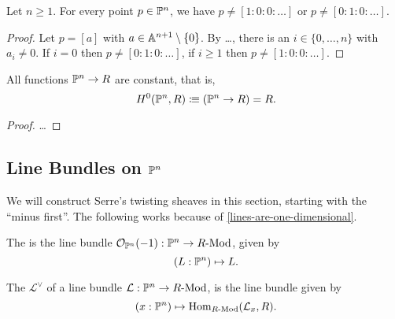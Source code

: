 \begin{lemma}
  Let $n \geq 1$.
  For every point $p \in \mathbb{P}^n$,
  we have $p \neq [1 : 0 : 0 : \dots]$
  or $p \neq [0 : 1 : 0 : \dots]$.
\end{lemma}

\begin{proof}
  Let $p = [a]$ with $a \in \mathbb{A}^{n+1} \setminus \{0\}$.
  By \dots,
  there is an $i \in \{0, \dots, n\}$ with $a_i \neq 0$.
  If $i = 0$ then $p \neq [0 : 1 : 0 : \dots]$,
  if $i \geq 1$ then $p \neq [1 : 0 : 0 : \dots]$.
\end{proof}

\begin{theorem}
  All functions $\mathbb{P}^n \to R$ are constant,
  that is,
  \[ H^0(\bP^n, R) \colonequiv (\bP^n \to R) = R \rlap{.} \]
\end{theorem}

\begin{proof}
  \dots
\end{proof}

\subsection{Line Bundles on $\mathbb{P}^n$}

We will construct Serre's twisting sheaves in this section,
starting with the ``minus first''.
The following works because of \cref{lines-are-one-dimensional}.

\begin{definition}
  The  is the line bundle $\mathcal O_{\mathbb{P}^n}(-1):\mathbb{P}^n\to R\text{-}\mathrm{Mod}$,
  given by
  \[ (L:\bP^n)\mapsto L\rlap{.}\]
\end{definition}

\begin{definition}
  The  $\mathcal L^\vee$ of a line bundle $\mathcal L:\mathbb{P}^n\to R\text{-}\mathrm{Mod}$,
  is the line bundle given by
  \[ (x:\bP^n)\mapsto \Hom_{\Mod{R}}(\mathcal L_x,R)\rlap{.}\]
\end{definition}
